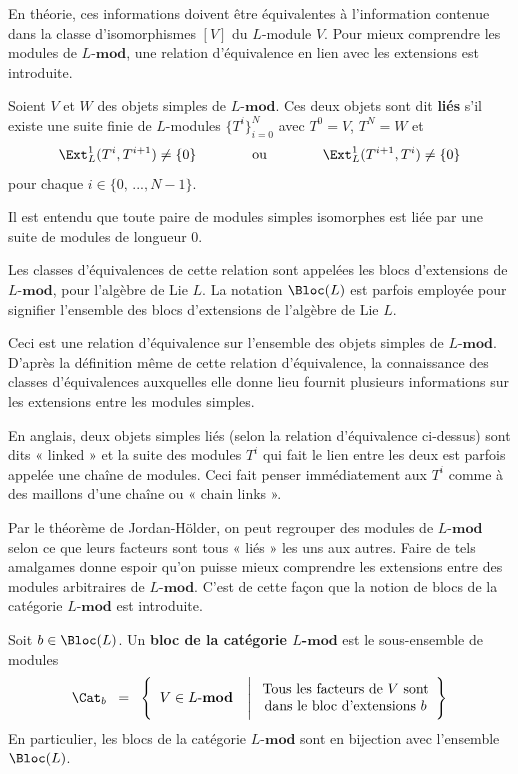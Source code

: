 En théorie, ces informations doivent être équivalentes à l'information contenue dans la classe d'isomorphismes $[V]$ du $L$-module $V$. Pour mieux comprendre les modules de $L$-$\mathbf{mod}$, une relation d'équivalence en lien avec les extensions est introduite.

\begin{Def} \label{defdebasebloc} Soient $V$ et $W$ des objets simples de $L$-$\mathbf{mod}$. Ces deux objets sont dit \textbf{liés} s'il existe une suite finie de $L$-modules $\{T^i\}_{i=0}^N$ avec $T^0 = V$, $T^N = W$ et
$$ \Ext_L^1(T^i,T^{i+1}) \neq \{0\} \qquad \qquad \text{ou} \qquad \qquad  \Ext_L^1(T^{i+1},T^i) \neq \{0\} $$ 
pour chaque $i \in \{0,\,..., N-1\}$.

Il est entendu que toute paire de modules simples isomorphes est liée par une suite de modules de longueur 0.

Les classes d'équivalences de cette relation sont appelées les blocs d'extensions de $L$-$\mathbf{mod}$, pour l'algèbre de Lie $L$. La notation $\Bloc(L)$ est parfois employée pour signifier l'ensemble des blocs d'extensions de l'algèbre de Lie $L$.
\end{Def}

Ceci est une relation d'équivalence sur l'ensemble des objets simples de $L$-$\mathbf{mod}$. D'après la définition même de cette relation d'équivalence, la connaissance des classes d'équivalences auxquelles elle donne lieu fournit plusieurs informations sur les extensions entre les modules simples.

\begin{Rem} En anglais, deux objets simples liés (selon la relation d'équivalence ci-dessus) sont dits « linked » et la suite des modules $T^i$ qui fait le lien entre les deux est parfois appelée une chaîne de modules. Ceci fait penser immédiatement aux $T^i$ comme à des maillons d'une chaîne ou « chain links ».
\end{Rem}

Par le théorème de Jordan-Hölder, on peut regrouper des modules de $L$-$\mathbf{mod}$ selon ce que leurs facteurs sont tous « liés » les uns aux autres. Faire de tels amalgames donne espoir qu'on puisse mieux comprendre les extensions entre des modules arbitraires de $L$-$\mathbf{mod}$. C'est de cette façon que la notion de blocs de la catégorie $L$-$\mathbf{mod}$ est introduite.

\begin{Def} Soit $b \in \Bloc(L)$. Un \textbf{bloc de la catégorie $L$-$\mathbf{mod}$}  est le sous-ensemble de modules
$$ \Cat_b \;\; = \;\; \left\{\;\; V \in L\text{-}\mathbf{mod} \quad \Bigg| \; \begin{array}{c} \text{Tous les facteurs de } V \text{ sont}\\
\text{dans le bloc d'extensions } b \end{array}\right\} $$
En particulier, les blocs de la catégorie $L$-$\mathbf{mod}$ sont en bijection avec l'ensemble $\Bloc(L)$.
\end{Def}

